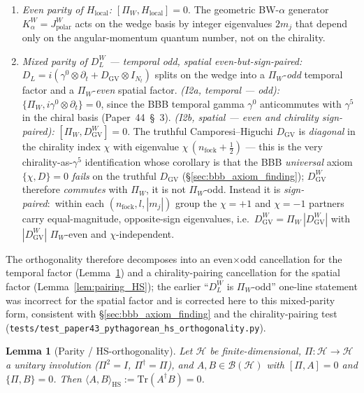 \documentclass[11pt,a4paper]{article}
\theoremstyle{plain}
\newtheorem{lemma}[theorem]{Lemma}
\theoremstyle{definition}
\newcommand{\Nt}{N_t}
\newcommand{\Tr}{\mathrm{Tr}}
\newcommand{\DGV}{D_{\mathrm{GV}}}
\newcommand{\DL}{D_{L}}
\begin{document}
\begin{enumerate}
\item[(I1)] \emph{Even parity of $H_{\mathrm{local}}$:}
$[\Pi_{W}, H_{\mathrm{local}}] = 0$. The geometric BW-$\alpha$
generator $K_{\alpha}^{W} = J_{\mathrm{polar}}^{W}$ acts on the
wedge basis by integer eigenvalues $2 m_{j}$ that depend only on
the angular-momentum quantum number, not on the chirality.

\item[(I2)] \emph{Mixed parity of $\DL^{W}$ --- temporal odd, spatial
even-but-sign-paired:}
$\DL = i(\gamma^{0} \otimes \partial_{t} + \DGV \otimes I_{\Nt})$
splits on the wedge into a $\Pi_{W}$-\emph{odd} temporal factor and a
$\Pi_{W}$-\emph{even} spatial factor.
\emph{(I2a, temporal --- odd):}
$\{\Pi_{W}, i\gamma^{0} \otimes \partial_{t}\} = 0$, since the BBB temporal
gamma $\gamma^{0}$ anticommutes with $\gamma^{5}$ in the chiral basis
(Paper~44~\S~3).
\emph{(I2b, spatial --- even and chirality sign-paired):}
$[\Pi_{W}, \DGV^{W}] = 0$. The truthful Camporesi--Higuchi $\DGV$ is
\emph{diagonal} in the chirality index $\chi$ with eigenvalue
$\chi\,(n_{\mathrm{fock}} + \tfrac{1}{2})$ --- this is the very
chirality-as-$\gamma^{5}$ identification whose corollary is that the BBB
\emph{universal} axiom $\{\chi, D\} = 0$ \emph{fails} on the truthful
$\DGV$ (\S\ref{sec:bbb_axiom_finding}); $\DGV^{W}$ therefore
\emph{commutes} with $\Pi_{W}$, it is not $\Pi_{W}$-odd. Instead it is
\emph{sign-paired}:\ within each $(n_{\mathrm{fock}}, l, |m_{j}|)$ group
the $\chi = +1$ and $\chi = -1$ partners carry equal-magnitude,
opposite-sign eigenvalues, i.e.\ $\DGV^{W} = \Pi_{W}\,|\DGV^{W}|$ with
$|\DGV^{W}|$ $\Pi_{W}$-even and $\chi$-independent.
\end{enumerate}
The orthogonality therefore decomposes into an even$\times$odd
cancellation for the temporal factor (Lemma~\ref{lem:parity_HS}) and a
chirality-pairing cancellation for the spatial factor
(Lemma~\ref{lem:pairing_HS}); the earlier ``$\DL^{W}$ is $\Pi_{W}$-odd''
one-line statement was incorrect for the spatial factor and is corrected
here to this mixed-parity form, consistent with
\S\ref{sec:bbb_axiom_finding} and the
chirality-pairing test (\texttt{tests/test\_paper43\_pythagorean\_hs\_orthogonality.py}).

\begin{lemma}[Parity / HS-orthogonality]\label{lem:parity_HS}
Let $\mathcal{H}$ be finite-dimensional, $\Pi : \mathcal{H} \to
\mathcal{H}$ a unitary involution ($\Pi^{2} = I$,
$\Pi^{\dagger} = \Pi$), and $A, B \in \mathcal{B}(\mathcal{H})$
with $[\Pi, A] = 0$ and $\{\Pi, B\} = 0$. Then
$\langle A, B \rangle_{\mathrm{HS}} := \Tr(A^{\dagger} B) = 0$.
\end{lemma}
\end{document}
